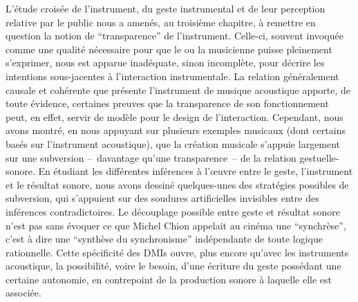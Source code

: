 
\noindent L’étude croisée de l’instrument, du geste instrumental et de leur perception relative par le public nous a amenés, au troisième chapitre, à remettre en question la notion de ``transparence'' de l’instrument. Celle-ci, souvent invoquée comme une qualité nécessaire pour que le ou la musicienne puisse pleinement s’exprimer, nous est apparue inadéquate, sinon incomplète, pour décrire les intentions sous-jacentes à l’interaction instrumentale. La relation généralement causale et cohérente que présente l’instrument de musique acoustique apporte, de toute évidence, certaines preuves que la transparence de son fonctionnement peut, en effet, servir de modèle pour le design de l’interaction. Cependant, nous avons montré, en nous appuyant sur plusieurs exemples musicaux (dont certains basés sur l’instrument acoustique), que la création musicale s’appuie largement sur une subversion --~davantage qu’une transparence~-- de la relation gestuelle-sonore. En étudiant les différentes inférences à l’œuvre entre le geste, l’instrument et le résultat sonore, nous avons dessiné quelques-unes des stratégies possibles de subversion, qui s’appuient sur des soudures artificielles invisibles entre des inférences contradictoires. Le découplage possible entre geste et résultat sonore n'est pas sans évoquer ce que Michel Chion appelait au cinéma une ``synchrèse'', c'est à dire une ``synthèse du synchronisme'' indépendante de toute logique rationnelle\cite{chion_audio-vision:_2013}. Cette spécificité des \glspl{DMI} ouvre, plus encore qu'avec les instruments acoustique, la possibilité, voire le besoin, d'une écriture du geste possédant une certaine autonomie, en contrepoint de la production sonore à laquelle elle est associée.


